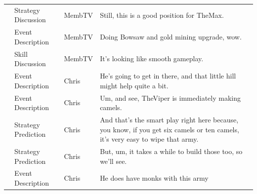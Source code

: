 {\begin{longtable}{@{}>{\theAppRow}r|L{2.3cm}L{1.0cm}U{11.55cm}@{}}
    & Strategy Discussion   & MembTV       & Still, this is a good position for TheMax.                                                                                                                                                                                                                       \\
    & Event Description     & MembTV       & Doing Bowsaw and gold mining upgrade, wow.                                                                                                                                                                                                                       \\
    & Skill Discussion      & MembTV       & It's looking like smooth gameplay.                                                                                                                                                                                                                               \\
    & Event Description     & Chris        & He's going to get in there, and that little hill might help quite a bit.                                                                                                                                                                                         \\
    & Event Description     & Chris        & Um, and see, TheViper is immediately making camels.                                                                                                                                                                                                              \\
    & Strategy Prediction   & Chris        & And that's the smart play right here because, you know, if you get six camels or ten camels, it's very easy to wipe that army.                                                                                                                                   \\
    & Strategy Prediction   & Chris        & But, um, it takes a while to build those too, so we'll see.                                                                                                                                                                                                      \\
    & Event Description     & Chris        & He does have monks with this army                                                                                                                                                                                                                                \\

\end{longtable}}
